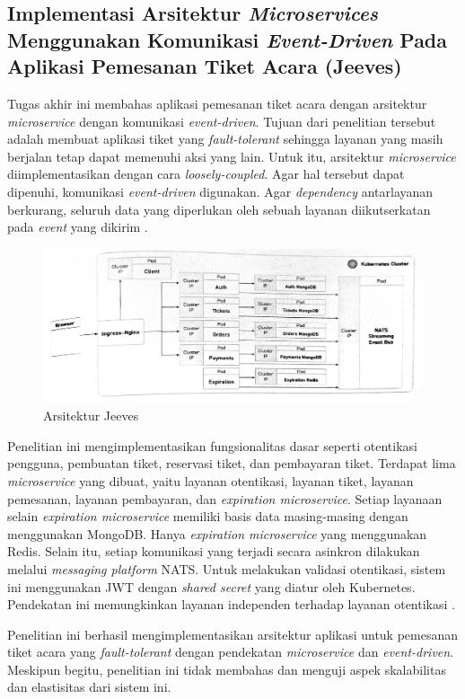\subsection{Implementasi Arsitektur \textit{Microservices} Menggunakan Komunikasi \textit{Event-Driven} Pada Aplikasi Pemesanan Tiket Acara (Jeeves)}

Tugas akhir ini membahas aplikasi pemesanan tiket acara dengan arsitektur \textit{microservice} dengan komunikasi \textit{event-driven}. Tujuan dari penelitian tersebut adalah membuat aplikasi tiket yang \textit{fault-tolerant} sehingga layanan yang masih berjalan tetap dapat memenuhi aksi yang lain. Untuk itu, arsitektur \textit{microservice} diimplementasikan dengan cara \textit{loosely-coupled}. Agar hal tersebut dapat dipenuhi, komunikasi \textit{event-driven} digunakan. Agar \textit{dependency} antarlayanan berkurang, seluruh data yang diperlukan oleh sebuah layanan diikutserkatan pada \textit{event} yang dikirim \parencite{microservicesEventDriven}.

\begin{figure}[htbp]
    \centering
    \includegraphics[width=1\textwidth]{resources/chapter-2/jeeves.png}
    \caption{Arsitektur Jeeves \parencite{microservicesEventDriven}}
    \label{fig:jeeves-architecture}
\end{figure}

Penelitian ini mengimplementasikan fungsionalitas dasar seperti otentikasi pengguna, pembuatan tiket, reservasi tiket, dan pembayaran tiket. Terdapat lima \textit{microservice} yang dibuat, yaitu layanan otentikasi, layanan tiket, layanan pemesanan, layanan pembayaran, dan \textit{expiration microservice}. Setiap layanaan selain \textit{expiration microservice} memiliki basis data masing-masing dengan menggunakan MongoDB. Hanya \textit{expiration microservice} yang menggunakan Redis. Selain itu, setiap komunikasi yang terjadi secara asinkron dilakukan melalui \textit{messaging platform} NATS. Untuk melakukan validasi otentikasi, sistem ini menggunakan JWT dengan \textit{shared secret} yang diatur oleh Kubernetes. Pendekatan ini memungkinkan layanan independen terhadap layanan otentikasi \parencite{microservicesEventDriven}.

Penelitian ini berhasil mengimplementasikan arsitektur aplikasi untuk pemesanan tiket acara yang \textit{fault-tolerant} dengan pendekatan \textit{microservice} dan \textit{event-driven}. Meskipun begitu, penelitian ini tidak membahas dan menguji aspek skalabilitas dan elastisitas dari sistem ini.